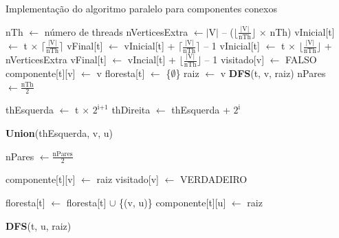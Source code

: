 \documentclass[12pt]{article}
\begin{document}
\begin{algorithm}[H]
    \DontPrintSemicolon
    \newcommand\mycommfont[1]{\small\ttfamily{#1}}
    \caption{Implementação do algoritmo paralelo para componentes conexos}
    \label{alg_par1}
    {
        nTh $\gets$ número de threads\;
        nVerticesExtra $\gets |\text{V}|$ -- ($\lfloor \frac{|\text{V}|}{\text{nTh}} \rfloor$ $\times$ nTh)\;
        {
            {
                vInicial[t] $\gets$ t $\times$ $\lceil\frac{|\text{V}|}{\text{nTh}}\rceil$\;
                vFinal[t] $\gets$ vInicial[t] + $\lceil\frac{|\text{V}|}{\text{nTh}}\rceil$ -- 1\;
            }
           {
                vInicial[t] $\gets$ t $\times$ $\lfloor\frac{|\text{V}|}{\text{nTh}}\rfloor$ + nVerticesExtra\;
                vFinal[t] $\gets$ vIncial[t] + $\lfloor\frac{|\text{V}|}{\text{nTh}}\rfloor$ -- 1\;
            }
        }
        {
            visitado[v] $\gets$ FALSO\;
        }
        {
            {
                componente[t][v] $\gets$ v\;
            }
            floresta[t] $\gets$ \{$\emptyset$\}\;
            {
                {
                    raiz $\gets$ v\;
                    \textbf{DFS}(t, v, raiz)\;
                }
            }
        }
        nPares $\gets \frac{\text{nTh}}{\text{2}}$\;
        {
            {
                thEsquerda $\gets$ t $\times$ $\text{2}^{\text{i+1}}$\;
                thDireita $\gets$ thEsquerda + $\text{2}^\text{i}$\;
                
                {
                    \textbf{Union}(thEsquerda, v, u)\;
                }
            }
            nPares $\gets \frac{\text{nPares}}{\text{2}}$\;
        }
    }
    {
        componente[t][v] $\gets$ raiz\;
        visitado[v] $\gets$ VERDADEIRO\;
        
        {
            floresta[t] $\gets$ floresta[t] $\cup$ \{(v, u)\}\;
            componente[t][u] $\gets$ raiz\;
            
            {
                {
                    \textbf{DFS}(t, u, raiz)\;
                }
            }
        }
    }
\end{algorithm}
    
\end{document}
